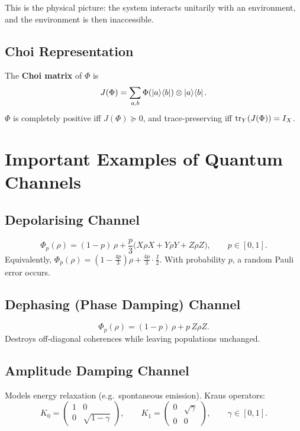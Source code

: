 \documentclass[11pt]{article}
\theoremstyle{definition}
\begin{document}
This is the physical picture: the system interacts unitarily with an environment, and the environment is then inaccessible.

\subsection{Choi Representation}

The \textbf{Choi matrix} of $\Phi$ is
\[
    J(\Phi) = \sum_{a,b}\Phi(\ket{a}\!\bra{b})\otimes\ket{a}\!\bra{b}.
\]
$\Phi$ is completely positive iff $J(\Phi)\succeq 0$, and trace-preserving iff $\tr_Y(J(\Phi))=I_X$.

\section{Important Examples of Quantum Channels}

\subsection{Depolarising Channel}

\[
    \Phi_p(\rho) = (1-p)\,\rho + \frac{p}{3}\bigl(X\rho X + Y\rho Y + Z\rho Z\bigr),
    \qquad p\in[0,1].
\]
Equivalently, $\Phi_p(\rho)=(1-\tfrac{4p}{3})\rho + \tfrac{4p}{3}\cdot\tfrac{I}{2}$.  With probability $p$, a random Pauli error occurs.

\subsection{Dephasing (Phase Damping) Channel}

\[
    \Phi_p(\rho) = (1-p)\,\rho + p\,Z\rho Z.
\]
Destroys off-diagonal coherences while leaving populations unchanged.

\subsection{Amplitude Damping Channel}

Models energy relaxation (e.g.\ spontaneous emission).  Kraus operators:
\[
    K_0 = \begin{pmatrix}1&0\\0&\sqrt{1-\gamma}\end{pmatrix},
    \qquad
    K_1 = \begin{pmatrix}0&\sqrt{\gamma}\\0&0\end{pmatrix},
    \qquad\gamma\in[0,1].
\]
\end{document}
